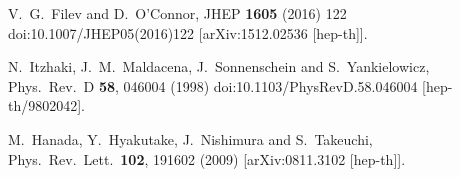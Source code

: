\documentclass[a4paper]{jpconf}
\begin{document}
\begin{thebibliography}{9}
  V.~G.~Filev and D.~O'Connor,
  JHEP {\bf 1605} (2016) 122
  doi:10.1007/JHEP05(2016)122
  [arXiv:1512.02536 [hep-th]].

  N.~Itzhaki, J.~M.~Maldacena, J.~Sonnenschein and S.~Yankielowicz,
  Phys.\ Rev.\ D {\bf 58}, 046004 (1998)
  doi:10.1103/PhysRevD.58.046004
  [hep-th/9802042].
  
  M.~Hanada, Y.~Hyakutake, J.~Nishimura and S.~Takeuchi,
  Phys.\ Rev.\ Lett.\  {\bf 102}, 191602 (2009)
  [arXiv:0811.3102 [hep-th]].

  \end{thebibliography}
\end{document}
